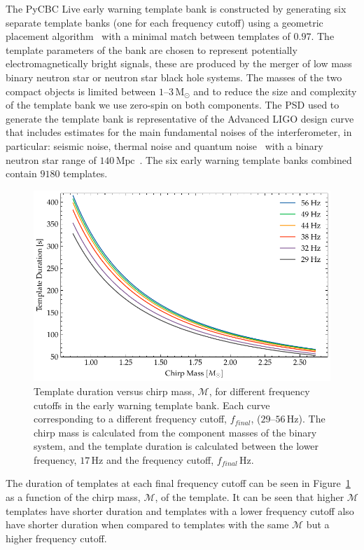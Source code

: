 The PyCBC Live early warning template bank is constructed by generating six separate template banks (one for each frequency cutoff) using a geometric placement algorithm~\cite{Harry_Lundgren:2012} with a minimal match between templates of $0.97$. The template parameters of the bank are chosen to represent potentially electromagnetically bright signals, these are produced by the merger of low mass binary neutron star or neutron star black hole systems. The masses of the two compact objects is limited between $1\text{--}3 \, \text{M$_\odot$}$ and to reduce the size and complexity of the template bank we use zero-spin on both components. The PSD used to generate the template bank is representative of the Advanced LIGO design curve that includes estimates for the main fundamental noises of the interferometer, in particular: seismic noise, thermal noise and quantum noise~\cite{aLIGO_design_curve:2018} with a binary neutron star range of $140 \, \text{Mpc}$~\cite{ligo_prospects:2016}. The six early warning template banks combined contain $9180$ templates.
%
\begin{figure}
    \centering
    \includegraphics[width=\textwidth]{images/6_earlywarning/search/template_bank_duration_mchirp.pdf}
    \caption{Template duration versus chirp mass, $\mathcal{M}$, for different frequency cutoffs in the early warning template bank. Each curve corresponding to a different frequency cutoff, $f_{final}$, ($29\text{--}56  \, \text{Hz}$). The chirp mass is calculated from the component masses of the binary system, and the template duration is calculated between the lower frequency, $17 \, \text{Hz}$ and the frequency cutoff, $f_{final} \, \text{Hz}$.}
    \label{6:fig:tb_duration_mchirp}
\end{figure}
%
The duration of templates at each final frequency cutoff can be seen in Figure~\ref{6:fig:tb_duration_mchirp} as a function of the chirp mass, $\mathcal{M}$, of the template. It can be seen that higher $\mathcal{M}$ templates have shorter duration and templates with a lower frequency cutoff also have shorter duration when compared to templates with the same $\mathcal{M}$ but a higher frequency cutoff.

